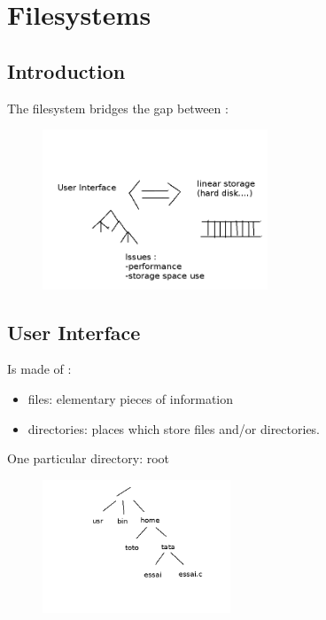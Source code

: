 
\chapter{Filesystems}

\section{Introduction}

The filesystem bridges the gap between :
\begin{figure}[h!]
  \begin{center}
    \includegraphics[width=0.6\textwidth]{filesystem.png}
  \end{center}
\end{figure}

\section{User Interface}

Is made of :

\begin{itemize}
  \item files: elementary pieces of information
  \item directories: places which store files and/or directories.
\end{itemize}
  
  One particular directory: root
  \begin{figure}[h!]
  \begin{center}
    \includegraphics[width=0.5\textwidth]{root.png}
  \end{center}
\end{figure}
  
